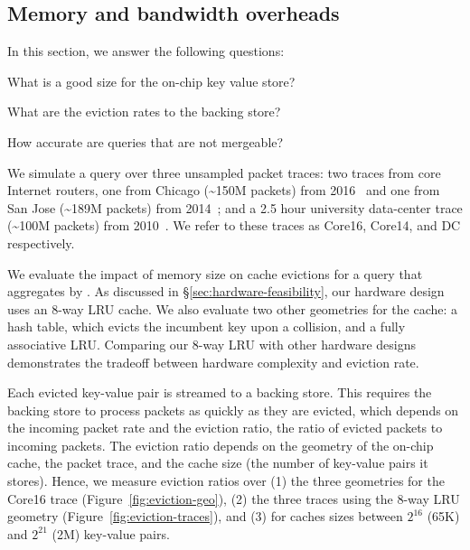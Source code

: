 \subsection{Memory and bandwidth overheads}
\label{s:eval:traces}
\label{sec:eval:traces}

In this section, we answer the following questions:
\begin{CompactEnumerate}
\item What is a good size for the on-chip key value store?
\item What are the eviction rates to the backing store?
\item How accurate are queries that are not mergeable?
\end{CompactEnumerate}

  We simulate a \TheSystem query over three unsampled
packet traces: two traces from \tenglink core Internet routers, one from
Chicago (\textasciitilde{}150M packets) from 2016~\cite{caida2016} and one from
San Jose (\textasciitilde{}189M packets) from 2014~\cite{caida2014}; and a 2.5
hour university data-center trace (\textasciitilde{}100M packets) from
2010~\cite{bensonDC}. We refer to these traces as Core16, Core14, and DC
respectively.

We evaluate the impact of memory size on cache evictions for a \TheSystem query
that aggregates by \txtftuple.  As discussed in
\S\ref{sec:hardware-feasibility}, our hardware design uses an 8-way LRU cache.
We also evaluate two other geometries for the cache: a hash table, which evicts
the incumbent key upon a collision, and a fully associative LRU. Comparing our
8-way LRU with other hardware designs demonstrates the tradeoff between
hardware complexity and eviction rate.

Each evicted key-value pair is streamed to a backing store.  This requires the
backing store to process packets as quickly as they are evicted, which depends
on the incoming packet rate and the eviction ratio, \ie the ratio of evicted
packets to incoming packets.  The eviction ratio depends on the geometry of the
on-chip cache, the packet trace, and the cache size (\ie the number of
key-value pairs it stores). Hence, we measure eviction ratios over (1) the
three geometries for the Core16 trace (Figure~\ref{fig:eviction-geo}), (2) the
three traces using the 8-way LRU geometry (Figure~\ref{fig:eviction-traces}),
and (3) for caches sizes between $2^{16}$ (65K) and $2^{21}$ (2M) key-value
pairs.


